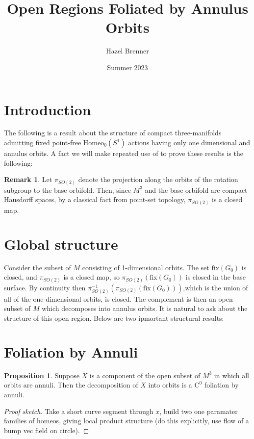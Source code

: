 \documentclass[10pt, oneside]{article}
\title{Open Regions Foliated by Annulus Orbits}
\author{Hazel Brenner}
\date{Summer 2023}
\newcommand{\homeoS}{\text{Homeo}_0(S^1)}
\theoremstyle{definition}
\newtheorem{rem}{Remark}
\newtheorem{prop}{Proposition}
\theoremstyle{definition}
\begin{document}
\maketitle

\section{Introduction}
The following is a result about the structure of compact three-manifolds admitting fixed point-free $\homeoS$ actions having only one dimensional and annulus orbits. A fact we will make repeated use of to prove these results is the following:

\begin{rem}
    Let $\pi_{SO(2)}$ denote the projection along the orbits of the rotation subgroup to the base orbifold. Then, since $M^3$ and the base orbifold are compact Hausdorff spaces, by a classical fact from point-set topology, $\pi_{SO(2)}$ is a closed map.
\end{rem}

\section{Global structure}
Consider the subset of $M$ consisting of 1-dimensional orbits. The set $\text{fix}(G_0)$ is closed, and $\pi_{SO(2)}$ is a closed map, so $\pi_{SO(2)}(\text{fix}(G_0))$ is closed in the base surface. By continuity then $\pi_{SO(2)}^{-1}(\pi_{SO(2)}(\text{fix}(G_0)))$,which is the union of all of the one-dimensional orbits, is closed.
The complement is then an open subset of $M$ which decomposes into annulus orbits. It is natural to ask about the structure of this open region. Below are two ipmortant structural results:

\section{Foliation by Annuli}

\begin{prop}
    Suppose $X$ is a component of the open subset of $M^3$ in which all orbits are annuli. Then the decomposition of $X$ into orbits is a $\text{C}^0$ foliation by annuli.
\end{prop}
\begin{proof}[Proof sketch]
    Take a short curve segment through $x$, build two one paramater families of homeos, giving local product structure (do this explicitly, use flow of a bump vec field on circle).
\end{proof}
\end{document}
